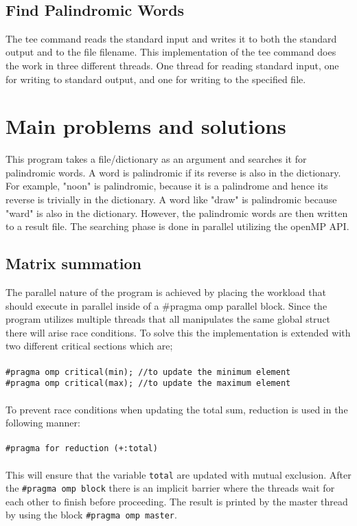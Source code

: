 \documentclass{article}
\begin{document}
\subsection{Find Palindromic Words}

The tee command reads the standard input and writes it to both the standard output and to the file filename. This implementation of the tee command does the work in three different threads. One thread for reading standard input, one for writing to standard output, and one for writing to the specified file.

\section{Main problems and solutions}

This program takes a file/dictionary as an argument and searches it for palindromic words. A word is palindromic if its reverse is also in the dictionary. For example, "noon" is palindromic, because it is a palindrome and hence its reverse is trivially in the dictionary. A word like "draw" is palindromic because "ward" is also in the dictionary. However,  the palindromic words are then written to a result file. The searching phase is done in parallel utilizing the openMP API.  


\subsection{Matrix summation}

The parallel nature of the program is achieved by placing the workload that should execute in parallel inside of a #pragma omp parallel block. Since the program utilizes multiple threads that all manipulates the same global struct there will arise race conditions. To solve this the implementation is extended with two different critical sections which are; \\\\
\texttt{#pragma omp critical(min);      //to update the minimum element}\\
\texttt{#pragma omp critical(max);      //to update the maximum element}
\\\\To prevent race conditions when updating the total sum, reduction is used in the following manner: 
\\\\\texttt{#pragma for reduction (+:total)}
\\\\This will ensure that the variable \texttt{total} are updated with mutual exclusion. After the \texttt{#pragma omp block} there is an implicit barrier where the threads wait for each other to finish before proceeding. The result is printed by the master thread by using the block \texttt{#pragma omp master}.  
\end{document}
